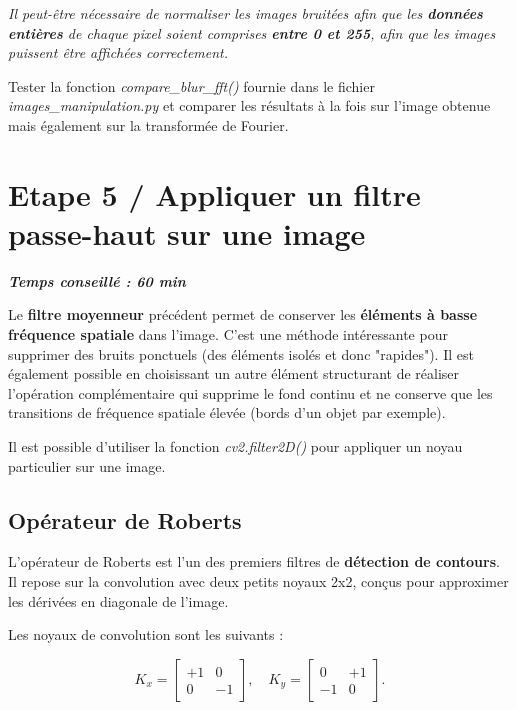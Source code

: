\documentclass[a4paper,11pt,titlepage]{article} %
\begin{document}
\medskip

\textit{Il peut-être nécessaire de normaliser les images bruitées afin que les \textbf{données entières} de chaque pixel soient comprises \textbf{entre 0 et 255}, afin que les images puissent être affichées correctement.} 

\Manip Tester la fonction \textsl{compare\_blur\_fft()} fournie dans le fichier \textsl{images\_manipulation.py} et comparer les résultats à la fois sur l'image obtenue mais également sur la transformée de Fourier.


\section{Etape 5 / Appliquer un filtre passe-haut sur une image}

\begin{center} \textbf{\textit{Temps conseillé : 60 min}} \end{center}

Le \textbf{filtre moyenneur} précédent permet de conserver les \textbf{éléments à basse fréquence spatiale} dans l'image. C'est une méthode intéressante pour supprimer des bruits ponctuels (des éléments isolés et donc "rapides"). Il est également possible en choisissant un autre élément structurant de réaliser l'opération complémentaire qui supprime le fond continu et ne conserve que les transitions de fréquence spatiale élevée (bords d'un objet par exemple).

\medskip

Il est possible d'utiliser la fonction \textsl{cv2.filter2D()} pour appliquer un noyau particulier sur une image.

\subsection{Opérateur de Roberts}

L'opérateur de Roberts est l'un des premiers filtres de \textbf{détection de contours}. Il repose sur la convolution avec deux petits noyaux 2x2, conçus pour approximer les dérivées en diagonale de l'image.

Les noyaux de convolution sont les suivants :

$$K_x = \begin{bmatrix}
+1 & 0 \\
0 & -1
\end{bmatrix},
\quad
K_y =
\begin{bmatrix}
0 & +1 \\
-1 & 0
\end{bmatrix}.
$$
\end{document}
